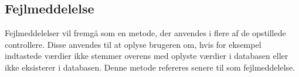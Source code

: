 \subsection*{Fejlmeddelelse}
Fejlmeddelelser vil fremgå som en metode, der anvendes i flere af de opstillede controllere. Disse anvendes til at oplyse brugeren om, hvis for eksempel indtastede værdier ikke stemmer overens med oplyste værdier i databasen eller ikke eksisterer i databasen. Denne metode refereres senere til som fejlmeddelelse. 